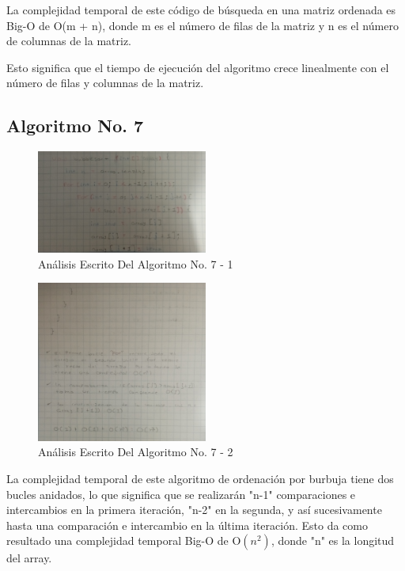 \documentclass[journal, spanish]{IEEEtran}
\begin{document}
La complejidad temporal de este código de búsqueda en una matriz ordenada es Big-O de O(m + n), donde m es el número de filas de la matriz y n es el número de columnas de la matriz.

Esto significa que el tiempo de ejecución del algoritmo crece linealmente con el número de filas y columnas de la matriz.

\subsection{Algoritmo No. 7}

\begin{figure}[H]
  \centering
  \includegraphics[width=0.5\textwidth]{images/IMG_20230913_023442~2.jpg}
  \caption{Análisis Escrito Del Algoritmo No. 7 - 1}
  \label{fig:nombre_de_tu_imagen}
\end{figure}

\begin{figure}[H]
  \centering
  \includegraphics[width=0.5\textwidth]{images/IMG_20230913_023451~2.jpg}
  \caption{Análisis Escrito Del Algoritmo No. 7 - 2}
  \label{fig:nombre_de_tu_imagen}
\end{figure}

La complejidad temporal de este algoritmo de ordenación por burbuja tiene dos bucles anidados, lo que significa que se realizarán "n-1" comparaciones e intercambios en la primera iteración, "n-2" en la segunda, y así sucesivamente hasta una comparación e intercambio en la última iteración. Esto da como resultado una complejidad temporal Big-O de O$(n^2)$, donde "n" es la longitud del array.
\end{document}
